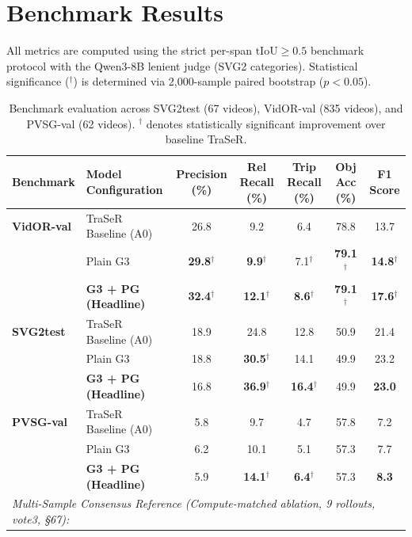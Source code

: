 \documentclass[11pt,a4paper]{article}
\newcommand{\sig}{$^{\dagger}$}
\begin{document}
\section{Benchmark Results}
All metrics are computed using the strict per-span $\text{tIoU} \ge 0.5$ benchmark protocol with the Qwen3-8B lenient judge (SVG2 categories). Statistical significance ($^{\dagger}$) is determined via 2,000-sample paired bootstrap ($p < 0.05$).

\begin{table}[H]
\centering
\caption{Benchmark evaluation across SVG2test (67 videos), VidOR-val (835 videos), and PVSG-val (62 videos). $^{\dagger}$ denotes statistically significant improvement over baseline TraSeR.}
\label{tab:main_results}
\small
\begin{tabular}{llccccc}
\toprule
\textbf{Benchmark} & \textbf{Model Configuration} & \textbf{Precision (\%)} & \textbf{Rel Recall (\%)} & \textbf{Trip Recall (\%)} & \textbf{Obj Acc (\%)} & \textbf{F1 Score} \\
\midrule
\textbf{VidOR-val} & TraSeR Baseline (A0)      & 26.8 & 9.2  & 6.4 & 78.8 & 13.7 \\
                   & Plain G3                  & \textbf{29.8}\sig & \textbf{9.9}\sig  & 7.1\sig & \textbf{79.1}\sig & \textbf{14.8}\sig \\
                   & \textbf{G3 + PG (Headline)} & \textbf{32.4}\sig & \textbf{12.1}\sig & \textbf{8.6}\sig & \textbf{79.1}\sig & \textbf{17.6}\sig \\
\midrule
\textbf{SVG2test}  & TraSeR Baseline (A0)      & 18.9 & 24.8 & 12.8 & 50.9 & 21.4 \\
                   & Plain G3                  & 18.8 & \textbf{30.5}\sig & 14.1 & 49.9 & 23.2 \\
                   & \textbf{G3 + PG (Headline)} & 16.8 & \textbf{36.9}\sig & \textbf{16.4}\sig & 49.9 & \textbf{23.0} \\
\midrule
\textbf{PVSG-val}  & TraSeR Baseline (A0)      & 5.8  & 9.7  & 4.7 & 57.8 & 7.2 \\
                   & Plain G3                  & 6.2  & 10.1 & 5.1 & 57.3 & 7.7 \\
                   & \textbf{G3 + PG (Headline)} & 5.9  & \textbf{14.1}\sig & \textbf{6.4}\sig & 57.3 & \textbf{8.3} \\
\midrule
\multicolumn{7}{l}{\textit{Multi-Sample Consensus Reference (Compute-matched ablation, 9 rollouts, vote3, §67):}} \\

\end{tabular}
\end{table}
\end{document}
